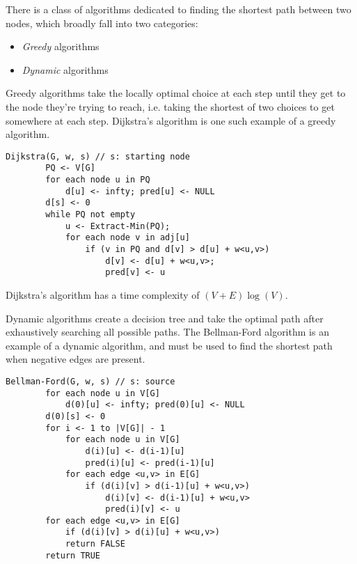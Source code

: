 There is a class of algorithms dedicated to finding the shortest 
path between two nodes, which broadly fall into two categories:
\begin{itemize}
    \item \emph{Greedy} algorithms
    \item \emph{Dynamic} algorithms
\end{itemize}
Greedy algorithms take the locally optimal choice at each step until they get to the 
node they're trying to reach, i.e. taking the shortest of two choices to get somewhere 
at each step. Dijkstra's algorithm is one such example of a greedy algorithm.
\begin{lstlisting}[caption={Dijkstra's algorithm}]
    Dijkstra(G, w, s) // s: starting node
        PQ <- V[G]
        for each node u in PQ
            d[u] <- infty; pred[u] <- NULL
        d[s] <- 0
        while PQ not empty
            u <- Extract-Min(PQ);
            for each node v in adj[u]
                if (v in PQ and d[v] > d[u] + w<u,v>)
                    d[v] <- d[u] + w<u,v>;
                    pred[v] <- u
\end{lstlisting}
Dijkstra's algorithm has a time complexity of $(V + E)\log(V)$. 

Dynamic algorithms create a decision tree and take the optimal path after exhaustively 
searching all possible paths. The Bellman-Ford algorithm is an example of a dynamic 
algorithm, and must be used to find the shortest path when negative edges are present.
\begin{lstlisting}[caption={Bellman-Ford algorithm}]
    Bellman-Ford(G, w, s) // s: source
        for each node u in V[G]
            d(0)[u] <- infty; pred(0)[u] <- NULL
        d(0)[s] <- 0
        for i <- 1 to |V[G]| - 1
            for each node u in V[G]
                d(i)[u] <- d(i-1)[u]
                pred(i)[u] <- pred(i-1)[u]
            for each edge <u,v> in E[G]
                if (d(i)[v] > d(i-1)[u] + w<u,v>)
                    d(i)[v] <- d(i-1)[u] + w<u,v>
                    pred(i)[v] <- u
        for each edge <u,v> in E[G]
            if (d(i)[v] > d(i)[u] + w<u,v>)
            return FALSE
        return TRUE
\end{lstlisting}
